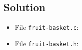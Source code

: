 
\subsection*{Solution}

\lstset{language=c,tabsize=4}
\begin{itemize}
\item[] File \texttt{fruit-basket.c}:

\newpage
\item[] File \texttt{fruit-basket.h}:

\end{itemize}

